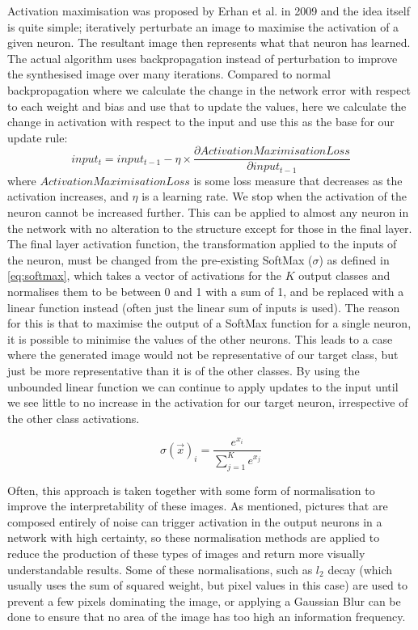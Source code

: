 \documentclass[12pt]{article}
\numberwithin{equation}{section}
\numberwithin{figure}{section}
\begin{document}
Activation maximisation was proposed by Erhan et al. \cite{erhan2009} in 2009 and the idea itself is quite simple; iteratively perturbate an image to maximise the activation of a given neuron. The resultant image then represents what that neuron has learned. The actual algorithm uses backpropagation instead of perturbation to improve the synthesised image over many iterations. Compared to normal backpropagation where we calculate the change in the network error with respect to each weight and bias and use that to update the values, here we calculate the change in activation with respect to the input and use this as the base for our update rule:
\begin{equation}
	input_{t} = input_{t-1} - \eta\times\frac{\partial ActivationMaximisationLoss}{\partial input_{t-1}}
\end{equation} 
where $ActivationMaximisationLoss$ is some loss measure that decreases as the activation increases, and $\eta$ is a learning rate. We stop when the activation of the neuron cannot be increased further. This can be applied to almost any neuron in the network with no alteration to the structure except for those in the final layer. The final layer activation function, the transformation applied to the inputs of the neuron, must be changed from the pre-existing SoftMax ($\sigma$) as defined in \cref{eq:softmax}, which takes a vector of activations for the $K$ output classes and normalises them to be between 0 and 1 with a sum of 1, and be replaced with a linear function instead (often just the linear sum of inputs is used). The reason for this is that to maximise the output of a SoftMax function for a single neuron, it is possible to minimise the values of the other neurons. This leads to a case where the generated image would not be representative of our target class, but just be more representative than it is of the other classes. By using the unbounded linear function we can continue to apply updates to the input until we see little to no increase in the activation for our target neuron, irrespective of the other class activations.

\begin{equation}
	\sigma(\vec{x})_i = \frac{e^{x_i}}{\sum_{j=1}^{K}e^{x_j}}
	\label{eq:softmax}
\end{equation}

Often, this approach is taken together with some form of normalisation to improve the interpretability of these images. As mentioned, pictures that are composed entirely of noise can trigger activation in the output neurons in a network with high certainty, so these normalisation methods are applied to reduce the production of these types of images and return more visually understandable results. Some of these normalisations, such as $l_2$ decay (which usually uses the sum of squared weight, but pixel values in this case) are used to prevent a few pixels dominating the image, or applying a Gaussian Blur can be done to ensure that no area of the image has too high an information frequency.
\end{document}
